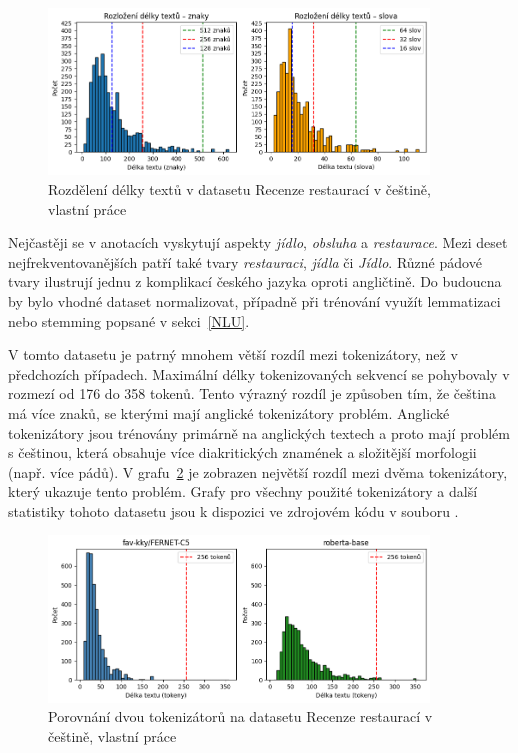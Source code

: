 \begin{figure}[ht]
    \centering
    \includegraphics[width=0.9\textwidth]{images/Czechrestaurants-distribution}
    \caption[Rozdělení délky textů v datasetu Recenze restaurací v češtině]%
    {Rozdělení délky textů v datasetu Recenze restaurací v češtině, vlastní práce}
    \label{fig:CzechRestaurantLenDistribution}
\end{figure}

Nejčastěji se v anotacích vyskytují aspekty \emph{jídlo}, \emph{obsluha} a \emph{restaurace}. Mezi deset nejfrekventovanějších patří také tvary \emph{restauraci}, \emph{jídla} či \emph{Jídlo}. Různé pádové tvary ilustrují jednu z komplikací českého jazyka oproti angličtině. Do budoucna by bylo vhodné dataset normalizovat, případně při trénování využít lemmatizaci nebo stemming popsané v sekci~\ref{NLU}.

V tomto datasetu je patrný mnohem větší rozdíl mezi tokenizátory, než v předchozích případech. Maximální délky tokenizovaných sekvencí se pohybovaly v rozmezí od 176 do 358 tokenů. Tento výrazný rozdíl je způsoben tím, že čeština má více znaků, se kterými mají anglické tokenizátory problém. Anglické tokenizátory jsou trénovány primárně na anglických textech a proto mají problém s češtinou, která obsahuje více diakritických znamének a složitější morfologii (např. více pádů). V grafu~\ref{fig:CzechRestaurantToken} je zobrazen největší rozdíl mezi dvěma tokenizátory, který ukazuje tento problém. Grafy pro všechny použité tokenizátory a další statistiky tohoto datasetu jsou k dispozici ve zdrojovém kódu v souboru .

\begin{figure}[ht]
    \centering
    \includegraphics[width=0.9\textwidth]{images/CzechrestaurantsToken}
    \caption[Porovnání dvou tokenizátorů na datasetu Recenze restaurací v češtině]%
    {Porovnání dvou tokenizátorů na datasetu Recenze restaurací v češtině, vlastní práce}
    \label{fig:CzechRestaurantToken}
\end{figure}

